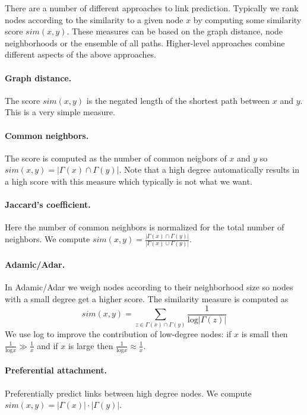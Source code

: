 There are a number of different approaches to link prediction. Typically we rank nodes according to the similarity to a given node $x$ by computing some similarity score $sim(x,y)$. These measures can be based on the graph distance, node neighborhoods or the ensemble of all paths. Higher-level approaches combine different aspects of the above approaches.

\paragraph{Graph distance.} The score $sim(x,y)$ is the negated length of the shortest path between $x$ and $y$. This is a very simple measure.

\paragraph{Common neighbors.} The score is computed as the number of common neigbors of $x$ and $y$ so $sim(x,y) = |\Gamma(x) \cap \Gamma(y)|$. Note that a high degree automatically results in a high score with this measure which typically is not what we want.

\paragraph{Jaccard's coefficient.} Here the number of common neighbors is normalized for the total number of neighbors. We compute $sim(x,y) = \frac{|\Gamma(x) \cap \Gamma(y)|}{|\Gamma(x) \cup \Gamma(y)|}$.

\paragraph{Adamic/Adar.} In Adamic/Adar we weigh nodes according to their neighborhood size so nodes with a small degree get a higher score. The similarity measure is computed as
$$
sim(x,y) = \sum_{z \in \Gamma(x) \cap \Gamma(y)} \frac{1}{\text{log} | \Gamma(z) |}
$$
We use log to improve the contribution of low-degree nodes: if $x$ is small then $\frac{1}{\text{log}x} \gg \frac{1}{x}$ and if $x$ is large then $\frac{1}{\text{log}x} \approx \frac{1}{x}$.

\paragraph{Preferential attachment.} Preferentially predict links between high degree nodes. We compute $sim(x,y) = |\Gamma(x)| \cdot |\Gamma(y)|$.

